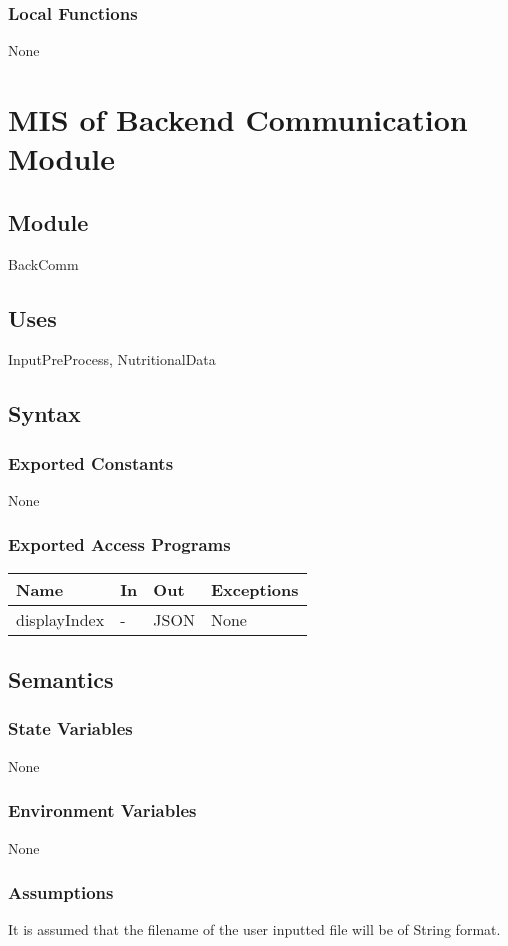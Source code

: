 \documentclass[12pt, titlepage]{article}
\begin{document}
\subsubsection{Local Functions}
None

\newpage

\section{MIS of Backend Communication Module} \label{BackComm}
\subsection{Module}
BackComm
\subsection{Uses}
InputPreProcess, NutritionalData
\subsection{Syntax}
\subsubsection{Exported Constants}
None
\subsubsection{Exported Access Programs}
\begin{center}
\begin{tabular}{p{2.5cm} p{0.5cm} p{4.5cm} p{5cm}}
\hline
\textbf{Name} & \textbf{In} & \textbf{Out} & \textbf{Exceptions} \\
\hline
displayIndex & - & JSON & None \\
\hline
\end{tabular}
\end{center}
\subsection{Semantics}
\subsubsection{State Variables}
None
\subsubsection{Environment Variables}
None
\subsubsection{Assumptions}
It is assumed that the filename of the user inputted file will be of String format.
\end{document}
